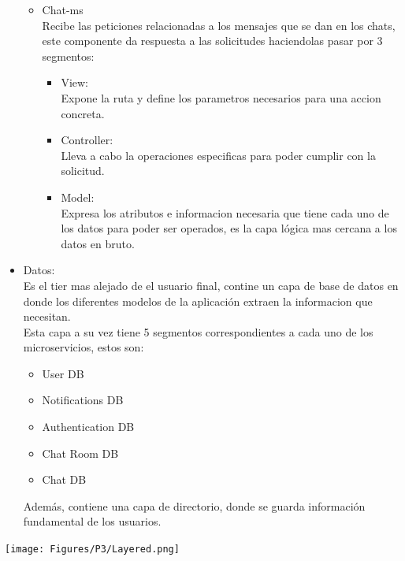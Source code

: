 \begin{itemize}
\begin{itemize}
        \item Chat-ms \\
        Recibe las peticiones relacionadas a los mensajes que se dan en los chats, este componente da respuesta a las solicitudes haciendolas pasar por 3 segmentos:
        \begin{itemize}
            \item View: \\
            Expone la ruta y define los parametros necesarios para una accion concreta.
            \item Controller: \\
            Lleva a cabo la operaciones especificas para poder cumplir con la solicitud.
            \item Model: \\
            Expresa los atributos e informacion necesaria que tiene cada uno de los datos para poder ser operados, es la capa lógica mas cercana a los datos en bruto.
        \end{itemize}
        
    \end{itemize}
    
    \item Datos: \\
    Es el tier mas alejado de el usuario final, contine un capa de base de datos en donde los diferentes modelos de la aplicación extraen la informacion que necesitan.\\
    Esta capa a su vez tiene 5 segmentos correspondientes a cada uno de los microservicios, estos son:
    \begin{itemize}
        \item User DB
        \item Notifications DB
        \item Authentication DB
        \item Chat Room DB
        \item Chat DB
    \end{itemize}
    Además, contiene una capa de directorio, donde se guarda información fundamental de los usuarios.
\end{itemize}

\begin{center}
    \texttt{[image: Figures/P3/Layered.png]}    
\end{center}

